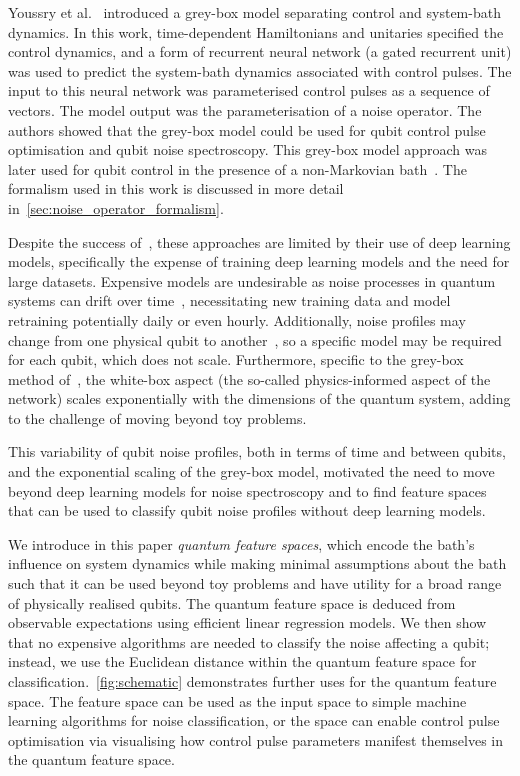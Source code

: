 \documentclass[12pt]{iopart}
\begin{document}
Youssry et al.~\cite{youssry2020characterization} introduced a grey-box model separating control and system-bath dynamics. In this work, time-dependent Hamiltonians and unitaries specified the control dynamics, and a form of recurrent neural network (a gated recurrent unit) was used to predict the system-bath dynamics associated with control pulses. The input to this neural network was parameterised control pulses as a sequence of vectors. The model output was the parameterisation of a noise operator. The authors showed that the grey-box model could be used for qubit control pulse optimisation and qubit noise spectroscopy. This grey-box model approach was later used for qubit control in the presence of a non-Markovian bath~\cite{youssry2022multi}. The formalism used in this work is discussed in more detail in~\cref{sec:noise_operator_formalism}.

Despite the success of~\cite{wise2021using,martina2023deep,youssry2020characterization,youssry2022multi}, these approaches are limited by their use of deep learning models, specifically the expense of training deep learning models and the need for large datasets. Expensive models are undesirable as noise processes in quantum systems can drift over time~\cite{seedhouse2025wavelet,nakamura2024gate}, necessitating new training data and model retraining potentially daily or even hourly. Additionally, noise profiles may change from one physical qubit to another~\cite {sung2019non}, so a specific model may be required for each qubit, which does not scale. Furthermore, specific to the grey-box method of~\cite{youssry2020characterization,youssry2022multi}, the white-box aspect (the so-called physics-informed aspect of the network) scales exponentially with the dimensions of the quantum system, adding to the challenge of moving beyond toy problems.

This variability of qubit noise profiles, both in terms of time and between qubits, and the exponential scaling of the grey-box model, motivated the need to move beyond deep learning models for noise spectroscopy and to find feature spaces that can be used to classify qubit noise profiles without deep learning models.

We introduce in this paper \textit{quantum feature spaces}, which encode the bath's influence on system dynamics while making minimal assumptions about the bath such that it can be used beyond toy problems and have utility for a broad range of physically realised qubits. The quantum feature space is deduced from observable expectations using efficient linear regression models. We then show that no expensive algorithms are needed to classify the noise affecting a qubit; instead, we use the Euclidean distance within the quantum feature space for classification.~\cref{fig:schematic} demonstrates further uses for the quantum feature space. The feature space can be used as the input space to simple machine learning algorithms for noise classification, or the space can enable control pulse optimisation via visualising how control pulse parameters manifest themselves in the quantum feature space.
\end{document}
